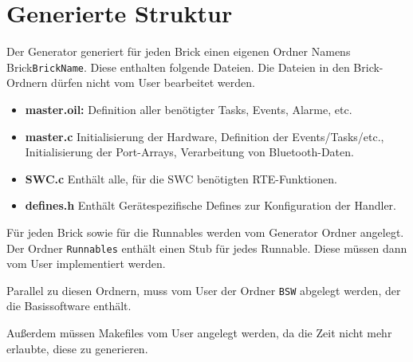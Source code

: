 \section{Generierte Struktur}

Der Generator generiert für jeden Brick einen eigenen Ordner Namens Brick\textunderscore \texttt{BrickName}. Diese enthalten folgende Dateien. Die Dateien in den Brick-Ordnern dürfen nicht vom User bearbeitet werden.

\begin{itemize}
\item \textbf{master.oil:} Definition aller benötigter Tasks, Events, Alarme, etc.
\item \textbf{master.c} Initialisierung der Hardware, Definition der Events/Tasks/etc., Initialisierung der Port-Arrays, Verarbeitung von Bluetooth-Daten.
\item \textbf{SWC.c} Enthält alle, für die SWC benötigten RTE-Funktionen.
\item \textbf{defines.h} Enthält Gerätespezifische Defines zur Konfiguration der Handler.
\end{itemize}

Für jeden Brick sowie für die Runnables werden vom Generator Ordner angelegt. Der Ordner \texttt{Runnables} enthält einen Stub für jedes Runnable. Diese müssen dann vom User implementiert werden.

Parallel zu diesen Ordnern, muss vom User der Ordner \texttt{BSW} abgelegt werden, der die Basissoftware enthält.

Außerdem müssen Makefiles vom User angelegt werden, da die Zeit nicht mehr erlaubte, diese zu generieren.
